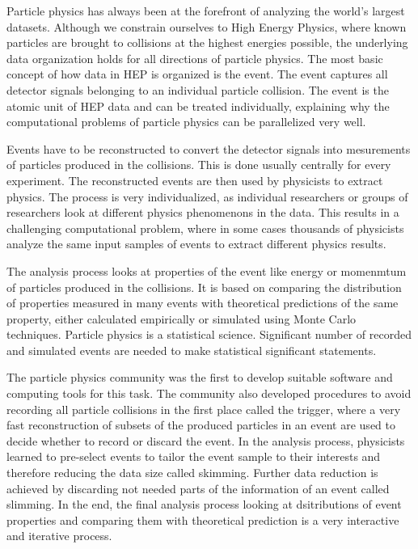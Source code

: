 \documentclass[a4paper]{jpconf}
\begin{document}
Particle physics has always been at the forefront of analyzing the world's largest datasets. Although we constrain ourselves to High Energy Physics, where known particles are brought to collisions at the highest energies possible, the underlying data organization holds for all directions of particle physics. The most basic concept of how data in HEP is organized is the event. The event captures all detector signals belonging to an individual particle collision. The event is the atomic unit of HEP data and can be treated individually, explaining why the computational problems of particle physics can be parallelized very well. 

Events have to be reconstructed to convert the detector signals into mesurements of particles produced in the collisions. This is done usually centrally for every experiment. The reconstructed events are then used by physicists to extract physics. The process is very individualized, as individual researchers or groups of researchers look at different physics phenomenons in the data. This results in a challenging computational problem, where in some cases thousands of physicists analyze the same input samples of events to extract different physics results.

The analysis process looks at properties of the event like energy or momenmtum of particles produced in the collisions. It is based on comparing the distribution of properties measured in many events with theoretical predictions of the same property, either calculated empirically or simulated using Monte Carlo techniques. Particle physics is a statistical science. Significant number of recorded and simulated events are needed to make statistical significant statements.

The particle physics community was the first to develop suitable software and computing tools for this task. The community also developed procedures to avoid recording all particle collisions in the first place called the trigger, where a very fast reconstruction of subsets of the produced particles in an event are used to decide whether to record or discard the event. In the analysis process, physicists learned to pre-select events to tailor the event sample to their interests and therefore reducing the data size called skimming. Further data reduction is achieved by discarding not needed parts of the information of an event called slimming. In the end, the final analysis process looking at dsitributions of event properties and comparing them with theoretical prediction is a very interactive and iterative process.
\end{document}
